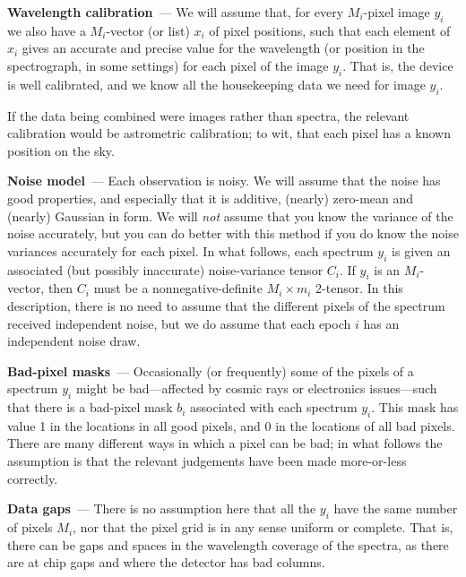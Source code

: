 \documentclass[modern]{aastex631}
\renewcommand{\paragraph}[1]{\medskip\par\noindent\textbf{#1}~---}
\begin{document}
\paragraph{Wavelength calibration}
We will assume that, for every $M_i$-pixel image $y_i$ we also have a $M_i$-vector (or list) $x_i$ of pixel positions, such that each element of $x_i$ gives an accurate and precise value for the wavelength (or position in the spectrograph, in some settings) for each pixel of the image $y_i$.
That is, the device is well calibrated, and we know all the housekeeping data we need for image $y_i$.

If the data being combined were images rather than spectra, the relevant calibration would be astrometric calibration; to wit, that each pixel has a known position on the sky.

\paragraph{Noise model}
Each observation is noisy.
We will assume that the noise has good properties, and especially that it is additive, (nearly) zero-mean and (nearly) Gaussian in form.
We will \emph{not} assume that you know the variance of the noise accurately, but you can do better with this method if you do know the noise variances accurately for each pixel.
In what follows, each spectrum $y_i$ is given an associated (but possibly inaccurate) noise-variance tensor $C_i$.
If $y_i$ is an $M_i$-vector, then $C_i$ must be a nonnegative-definite $M_i\times m_i$ 2-tensor.
In this description, there is no need to assume that the different pixels of the spectrum received independent noise, but we do assume that each epoch $i$ has an independent noise draw.

\paragraph{Bad-pixel masks}
Occasionally (or frequently) some of the pixels of a spectrum $y_i$ might be bad---affected by cosmic rays or electronics issues---such that there is a bad-pixel mask $b_i$ associated with each spectrum $y_i$.
This mask has value 1 in the locations in all good pixels, and 0 in the locations of all bad pixels.
There are many different ways in which a pixel can be bad; in what follows the assumption is that the relevant judgements have been made more-or-less correctly.

\paragraph{Data gaps}
There is no assumption here that all the $y_i$ have the same number of pixels $M_i$, nor that the pixel grid is in any sense uniform or complete.
That is, there can be gaps and spaces in the wavelength coverage of the spectra, as there are at chip gaps and where the detector has bad columns.
\end{document}
